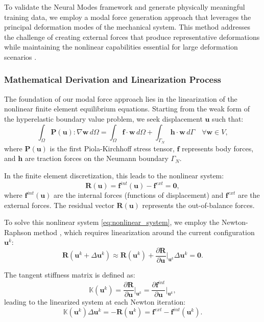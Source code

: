 To validate the Neural Modes framework and generate physically meaningful training data, we employ a modal force generation approach that leverages the principal deformation modes of the mechanical system. This method addresses the challenge of creating external forces that produce representative deformations while maintaining the nonlinear capabilities essential for large deformation scenarios \cite{odotDeepPhysicsPhysicsAware2021}.

\subsubsection{Mathematical Derivation and Linearization Process}
The foundation of our modal force approach lies in the linearization of the nonlinear finite element equilibrium equations. Starting from the weak form of the hyperelastic boundary value problem, we seek displacement $\bm{u}$ such that:
\begin{equation}
    \int_{\Omega} \bm{P}(\bm{u}) : \nabla \bm{w} \, d\Omega = \int_{\Omega} \bm{f} \cdot \bm{w} \, d\Omega + \int_{\Gamma_N} \bm{h} \cdot \bm{w} \, d\Gamma \quad \forall \bm{w} \in V,
    \label{eq:weak_form_modal}
\end{equation}
where $\bm{P}(\bm{u})$ is the first Piola-Kirchhoff stress tensor, $\bm{f}$ represents body forces, and $\bm{h}$ are traction forces on the Neumann boundary $\Gamma_N$.

In the finite element discretization, this leads to the nonlinear system:
\begin{equation}
    \bm{R}(\bm{u}) = \bm{f}^{int}(\bm{u}) - \bm{f}^{ext} = \bm{0},
    \label{eq:nonlinear_system}
\end{equation}
where $\bm{f}^{int}(\bm{u})$ are the internal forces (functions of displacement) and $\bm{f}^{ext}$ are the external forces. The residual vector $\bm{R}(\bm{u})$ represents the out-of-balance forces.

To solve this nonlinear system \eqref{eq:nonlinear_system}, we employ the Newton-Raphson method \cite{Dedieu_2015}, which requires linearization around the current configuration $\bm{u}^k$:
\begin{equation}
    \bm{R}(\bm{u}^k + \Delta\bm{u}^k) \approx \bm{R}(\bm{u}^k) + \frac{\partial \bm{R}}{\partial \bm{u}}\bigg|_{\bm{u}^k} \Delta\bm{u}^k = \bm{0}.
    \label{eq:newton_raphson}
\end{equation}

The tangent stiffness matrix is defined as:
\begin{equation}
    \mathbb{K}(\bm{u}^k) = \frac{\partial \bm{R}}{\partial \bm{u}}\bigg|_{\bm{u}^k} = \frac{\partial \bm{f}^{int}}{\partial \bm{u}}\bigg|_{\bm{u}^k},
    \label{eq:tangent_stiffness}
\end{equation}
leading to the linearized system at each Newton iteration:
\begin{equation}
    \mathbb{K}(\bm{u}^k) \Delta\bm{u}^k = -\bm{R}(\bm{u}^k) = \bm{f}^{ext} - \bm{f}^{int}(\bm{u}^k).
    \label{eq:linearized_system}
\end{equation}

